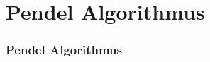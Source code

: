 \section{Pendel Algorithmus}
\label{sec:pendel-algorithmus}

\begin{frame}
  \frametitle{Pendel Algorithmus}

\end{frame}